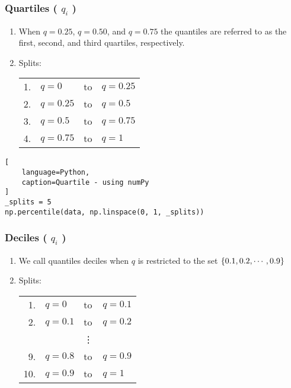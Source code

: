 \subsubsection{Quartiles ( $q_i$ ) \cite{statistics/book/Statistics-for-Data-Scientists/Maurits-Kaptein}} \label{Data/Describing Data/Central Tendency/Quartiles}

\begin{enumerate}
    \item When $q = 0.25$, $q = 0.50$, and $q = 0.75$ the quantiles are referred to as the first, second, and third quartiles, respectively. \hfill \cite{statistics/book/Statistics-for-Data-Scientists/Maurits-Kaptein}
    \label{Data/Describing Data/Central Tendency/Quartiles/first quartile}
    \label{Data/Describing Data/Central Tendency/Quartiles/second quartile}
    \label{Data/Describing Data/Central Tendency/Quartiles/third quartile}

    \item Splits: \\
    \begin{tabular}{r l l l} %
        1. & $q = 0$ & to & $q = 0.25$ \\
        2. & $q = 0.25$ & to & $q = 0.5$ \\
        3. & $q = 0.5$ & to & $q = 0.75$ \\
        4. & $q = 0.75$ & to & $q = 1$ \\
    \end{tabular}
\end{enumerate}

\begin{lstlisting}[
    language=Python, 
    caption=Quartile - using numPy
]
_splits = 5
np.percentile(data, np.linspace(0, 1, _splits))
\end{lstlisting}


\subsubsection{Deciles ( $q_i$ ) \cite{statistics/book/Statistics-for-Data-Scientists/Maurits-Kaptein}} \label{Data/Describing Data/Central Tendency/Deciles}

\begin{enumerate}
    \item We call quantiles deciles when $q$ is restricted to the set $\left\{0.1, 0.2,\cdots, 0.9\right\}$ \hfill \cite{statistics/book/Statistics-for-Data-Scientists/Maurits-Kaptein}

    \item Splits: \\
    \begin{tabular}{r l l l} %
        1. & $q = 0$ & to & $q = 0.1$ \\
        2. & $q = 0.1$ & to & $q = 0.2$ \\
        && \vdots & \\
        9. & $q = 0.8$ & to & $q = 0.9$ \\
        10. & $q = 0.9$ & to & $q = 1$ \\
    \end{tabular}
\end{enumerate}


